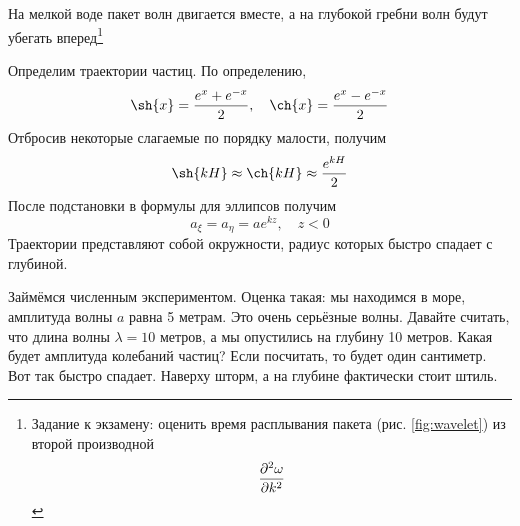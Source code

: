 На мелкой воде пакет волн двигается вместе, а на глубокой гребни волн будут убегать вперед\footnote{
 Задание к экзамену: оценить время расплывания пакета (рис. \ref{fig:wavelet}) из второй производной
$$
	\pdv[2]{\omega}{k} 	
$$ }


Определим траектории частиц. По определению, 
\begin{equation}
    \sh{x} = \frac{e^x+e^{-x}}{2}, \quad \ch{x} = \frac{e^x-e^{-x}}{2}
\end{equation}
Отбросив некоторые слагаемые по порядку малости, получим
\begin{equation}
    \sh{kH}\approx\ch{kH}\approx \frac{e^{kH}}{2} 
\end{equation}
После подстановки в формулы для эллипсов получим
\begin{equation}
    a_\xi = a_\eta = ae^{kz}, \quad z<0
\end{equation}
Траектории представляют собой окружности, радиус которых быстро спадает с глубиной. 

Займёмся численным экспериментом. 
Оценка такая: мы находимся в море, амплитуда волны $a$ равна 5 метрам.
Это очень серьёзные волны. 
Давайте считать, что длина волны $\lambda=10$  метров, а мы опустились на глубину 10 метров.
Какая будет амплитуда колебаний частиц? Если посчитать, то будет один сантиметр. Вот так быстро спадает. Наверху шторм, а на глубине фактически стоит штиль.




